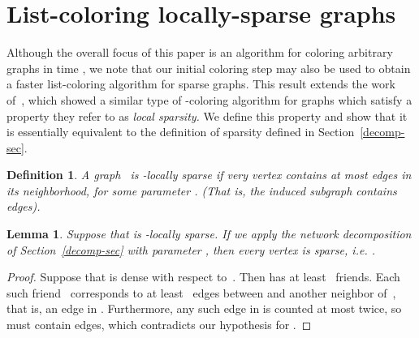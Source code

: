 \documentclass[11pt]{amsart}
\newtheorem{lemma}[theorem]{Lemma}
\newtheorem{definition}[theorem]{Definition}
\begin{document}
\iffalse
We have shown that after the  dense coloring steps, the number of dense neighbors of each dense vertex shrinks to . Also, for each sparse vertex~, we have  due to the initial coloring step. By applying the algorithm of Elkin, Pettie, and Su~\cite[Section 4]{elk15} on the sparse component, it can be colored in  rounds. Then, we apply the algorithm of Barenboim et al.~\cite{BEPS16} to color the remaining vertices whose degrees are bounded by . It then runs in  rounds. The total number of rounds is .
\fi

\section{List-coloring locally-sparse graphs}
\label{list-color-locally-sparse-sec}
Although the overall focus of this paper is an algorithm for coloring arbitrary graphs in time , we note that our initial coloring step may also be used to obtain a faster list-coloring algorithm for sparse graphs. This result extends the work of~\cite{elk15}, which showed a similar type of -coloring algorithm for graphs which satisfy a property they refer to as \emph{local sparsity.} We define this property and show that it is essentially equivalent to the definition of sparsity defined in Section~\ref{decomp-sec}.
\begin{definition}
A graph~ is \emph{-locally sparse} if very vertex contains at most  edges in its neighborhood, for some parameter . (That is, the induced subgraph  contains  edges).
\end{definition}

\iffalse
\begin{lemma}
Suppose that we have a network decomposition with sparsity parameter~. The neighborhood of a sparse vertex~ spans at most  edges. That is, .
 \end{lemma}
\begin{proof}
We can count the number of edges in the neighborhood of  by:

\end{proof}
\fi

\begin{lemma}\label{sparse-equiv-prop}
Suppose that  is -locally sparse. If we apply the network decomposition of Section~\ref{decomp-sec} with parameter , then every vertex is sparse, i.e. .
\end{lemma}
\begin{proof}
Suppose that  is dense with respect to~. Then  has at least~ friends. Each such friend~ corresponds to at least~ edges between  and another neighbor of~, that is, an edge in . Furthermore, any such edge in  is counted at most twice, so  must contain  edges, which contradicts our hypothesis for .
\end{proof}
\end{document}
